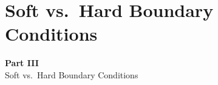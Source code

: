 \documentclass[aspectratio=169,11pt]{beamer}
\begin{document}

\section{Soft vs.\ Hard Boundary Conditions}

\begin{frame}{}
\vfill
\begin{center}
{\Huge \textcolor{uzhblue}{\textbf{Part III}}}\\[12pt]
{\LARGE Soft vs.\ Hard Boundary Conditions}
\end{center}
\vfill
\end{frame}
\end{document}
